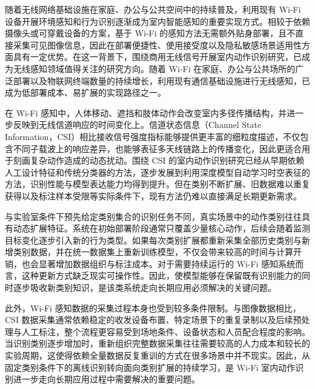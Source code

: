 


随着无线网络基础设施在家庭、办公与公共空间中的持续普及，利用现有 Wi-Fi 设备开展环境感知和行为识别逐渐成为室内智能感知的重要实现方式。相较于依赖摄像头或可穿戴设备的方案，基于 Wi-Fi 的感知方法无需额外贴身部署，且不直接采集可见图像信息，因此在部署便捷性、使用接受度以及隐私敏感场景适用性方面具有一定优势。在这一背景下，围绕商用无线信号开展室内动作识别研究，已成为无线感知领域值得关注的研究方向。随着 Wi-Fi 在家庭、办公与公共场所的广泛部署\cite{ma2019wifi,oughton2021wifi5g}以及物联网终端数量的持续增长\cite{zeinab2017iot}，利用现有通信基础设施进行无线感知，已成为低部署成本、易扩展的实现路径之一。

在 Wi-Fi 感知中，人体移动、遮挡和肢体动作会改变室内多径传播结构，并进一步反映到无线信道响应的时间变化上。信道状态信息（Channel State Information，CSI）相比接收信号强度指标能够提供更丰富的细粒度描述，不仅包含不同子载波上的响应差异，也能够表征多天线链路上的传播变化，因此更适合用于刻画复杂动作造成的动态扰动\cite{ma2019wifi}。围绕 CSI 的室内动作识别研究已经从早期依赖人工设计特征和传统分类器的方法，逐步发展到利用深度模型自动学习时空表征的方法，识别性能与模型表达能力均得到提升。但在类别不断扩展、旧数据难以重复获得以及标注样本受限等实际条件下，现有方法仍难以直接满足长期更新需求。

与实验室条件下预先给定类别集合的识别任务不同，真实场景中的动作类别往往具有动态扩展特征。系统在初始部署阶段通常只覆盖少量核心动作，后续会随着监测目标变化逐步引入新的行为类型。如果每次类别扩展都重新采集全部历史类别与新增类别数据，并在统一数据集上重新训练模型，不仅会带来较高的时间与计算开销，也会显著增加数据组织与标注成本。对于需要持续运行的 Wi-Fi 感知系统而言，这种更新方式缺乏现实可操作性。因此，使模型能够在保留既有识别能力的同时逐步吸收新类别知识，是该类系统走向长期应用必须解决的关键问题。

此外，Wi-Fi 感知数据的采集过程本身也受到较多条件限制。与图像数据相比，CSI 数据采集通常依赖稳定的收发设备布置、特定场景下的重复录制以及后续预处理与人工标注，整个流程更容易受到场地条件、设备状态和人员配合程度的影响。当识别类别逐步增加时，重新组织完整数据采集往往需要较高的人力成本和较长的实验周期，这使得依赖全量数据反复重训的方式在很多场景中并不现实。因此，从固定类别条件下的离线识别转向面向类别扩展的持续学习，是 Wi-Fi 室内动作识别进一步走向长期应用过程中需要解决的重要问题。

